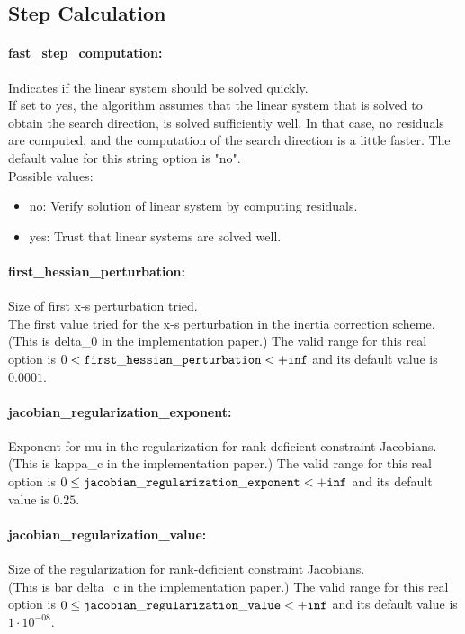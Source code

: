 \subsection{Step Calculation}
\label{sec:Step_Calculation}
\paragraph{fast\_step\_computation:}\label{sec:fast_step_computation} Indicates if the linear system should be solved quickly. $\;$ \\
 If set to yes, the algorithm assumes that the
linear system that is solved to obtain the search
direction, is solved sufficiently well. In that
case, no residuals are computed, and the
computation of the search direction is a little
faster.
The default value for this string option is "no".
\\ 
Possible values:
\begin{itemize}
   \item no: Verify solution of linear system by computing
residuals.
   \item yes: Trust that linear systems are solved well.
\end{itemize}

\paragraph{first\_hessian\_perturbation:}\label{sec:first_hessian_perturbation} Size of first x-s perturbation tried. $\;$ \\
 The first value tried for the x-s perturbation in
the inertia correction scheme.(This is delta\_0
in the implementation paper.) The valid range for this real option is 
$0 <  {\tt first\_hessian\_perturbation } <  {\tt +inf}$
and its default value is $0.0001$.


\paragraph{jacobian\_regularization\_exponent:}\label{sec:jacobian_regularization_exponent} Exponent for mu in the regularization for rank-deficient constraint Jacobians. $\;$ \\
 (This is kappa\_c in the implementation paper.) The valid range for this real option is 
$0 \le {\tt jacobian\_regularization\_exponent } <  {\tt +inf}$
and its default value is $0.25$.


\paragraph{jacobian\_regularization\_value:}\label{sec:jacobian_regularization_value} Size of the regularization for rank-deficient constraint Jacobians. $\;$ \\
 (This is bar delta\_c in the implementation
paper.) The valid range for this real option is 
$0 \le {\tt jacobian\_regularization\_value } <  {\tt +inf}$
and its default value is $1 \cdot 10^{-08}$.


